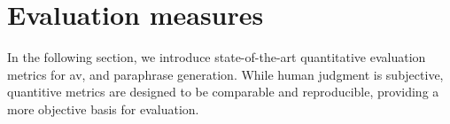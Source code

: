 \section{Evaluation measures}
\label{sec:evaluation_measures}

In the following section, we introduce state-of-the-art quantitative evaluation metrics for \ac{av}, and paraphrase generation. 
While human judgment is subjective, quantitive metrics are designed to be comparable and reproducible, providing a more objective basis for evaluation.





